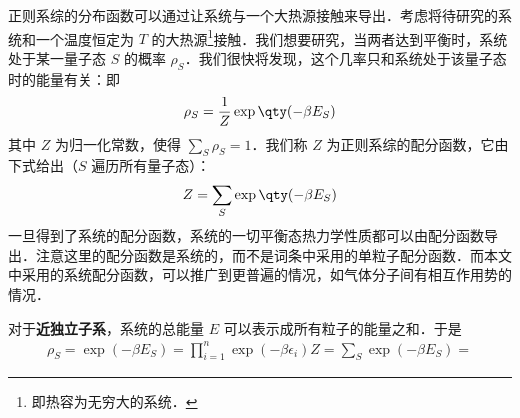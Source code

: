 
\begin{issues}
\issueDraft
\end{issues}

正则系综的分布函数可以通过让系统与一个大热源接触来导出．考虑将待研究的系统和一个温度恒定为 $T$ 的大热源\footnote{即热容为无穷大的系统．}接触．我们想要研究，当两者达到平衡时，系统处于某一量子态 $S$ 的概率 $\rho_S$．我们很快将发现，这个几率只和系统处于该量子态时的能量有关：即
\begin{equation}
\rho_S=\frac{1}{Z}\exp\qty(-\beta E_S)
\end{equation}
其中 $Z$ 为归一化常数，使得 $\sum_S \rho_S=1$．我们称 $Z$ 为正则系综的配分函数，它由下式给出（$S$ 遍历所有量子态）：
\begin{equation}
Z=\sum_S \exp\qty(-\beta E_S)
\end{equation}
一旦得到了系统的配分函数，系统的一切平衡态热力学性质都可以由配分函数导出．注意这里的配分函数是系统的，而不是词条中采用的单粒子配分函数．而本文中采用的系统配分函数，可以推广到更普遍的情况，如气体分子间有相互作用势的情况．

对于\textbf{近独立子系}，系统的总能量 $E$ 可以表示成所有粒子的能量之和．于是
\begin{equation}
\begin{aligned}
\rho_S=\exp(-\beta E_S)=\prod_{i=1}^n\exp(-\beta\epsilon_i)
Z=\sum_S\exp(-\beta E_S)=
\end{aligned}
\end{equation}
